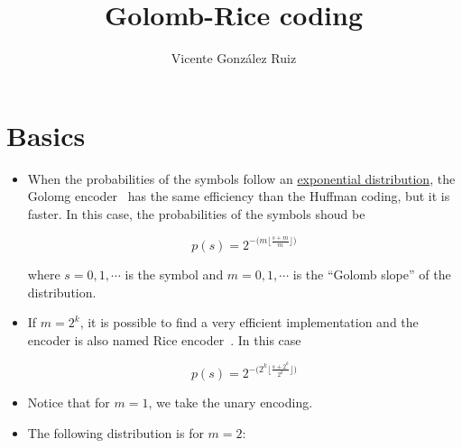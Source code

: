 \title{Golomb-Rice coding}
\author{Vicente González Ruiz}
\maketitle
\tableofcontents

\section{Basics}  
\begin{itemize}
\item
  When the probabilities of the symbols follow an
  \href{https://en.wikipedia.org/wiki/Exponential_distribution}{exponential
  distribution}, the Golomg encoder~\cite{golomb1966run} has the same efficiency than the
  Huffman coding, but it is faster. In this case, the probabilities of
  the symbols shoud be

  \begin{equation}
    p(s) =
    2^{\displaystyle-\Big(\displaystyle m\big\lfloor\displaystyle\frac{s+m}{m}\big\rfloor\Big)}
    \tag{Eq:Golomb}
  \end{equation}

  where \(s=0,1,\cdots\) is the symbol and \(m=0,1,\cdots\) is the
  ``Golomb slope'' of the distribution.
\item
  If \(m=2^k\), it is possible to find a very efficient implementation
  and the encoder is also named Rice encoder~\cite{rice1971adaptive}. In this case

  \begin{equation}
    p(s) =
    2^{\displaystyle-\Big(2^k \displaystyle\big\lfloor\displaystyle\frac{s+2^k}{2^k}\big\rfloor\Big)}
    \tag{Eq:Rice}
    \label{eq:Rice}
  \end{equation}
\end{itemize}


\begin{itemize}
\item
  Notice that for \(m=1\), we take the unary encoding.
\item
  The following distribution is for \(m=2\):
\end{itemize}

